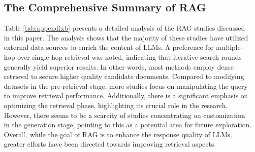 \subsection{The Comprehensive Summary of RAG}

Table \ref{tab:appendixb} presents a detailed analysis of the RAG studies discussed in this paper. The analysis shows that the majority of these studies have utilized external data sources to enrich the content of LLMs. A preference for multiple-hop over single-hop retrieval was noted, indicating that iterative search rounds generally yield superior results. In other words, most methods employ dense retrieval to secure higher quality candidate documents. Compared to modifying datasets in the pre-retrieval stage, more studies focus on manipulating the query to improve retrieval performance. Additionally, there is a significant emphasis on optimizing the retrieval phase, highlighting its crucial role in the research. However, there seems to be a scarcity of studies concentrating on customization in the generation stage, pointing to this as a potential area for future exploration. Overall, while the goal of RAG is to enhance the response quality of LLMs, greater efforts have been directed towards improving retrieval aspects.

